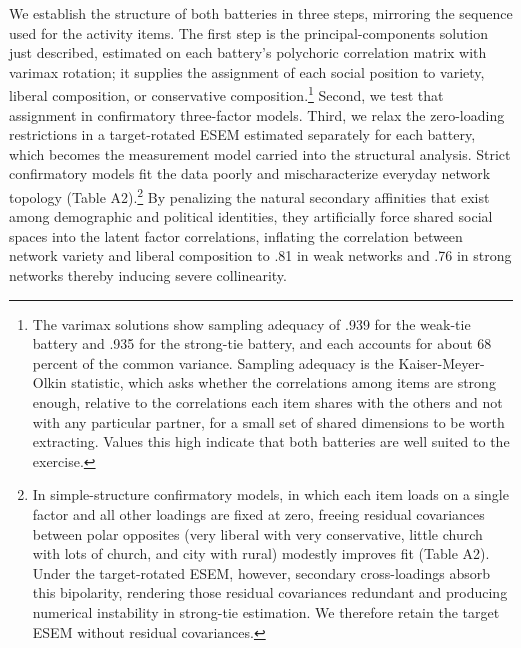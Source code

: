 \documentclass[
  12pt
]{article}
\begin{document}
We establish the structure of both batteries in three steps, mirroring the sequence used for the activity items. The first step is the principal-components solution just described, estimated on each battery's polychoric correlation matrix with varimax rotation; it supplies the assignment of each social position to variety, liberal composition, or conservative composition.\footnote{The varimax solutions show sampling adequacy of .939 for the weak-tie battery and .935 for the strong-tie battery, and each accounts for about 68 percent of the common variance. Sampling adequacy is the Kaiser-Meyer-Olkin statistic, which asks whether the correlations among items are strong enough, relative to the correlations each item shares with the others and not with any particular partner, for a small set of shared dimensions to be worth extracting. Values this high indicate that both batteries are well suited to the exercise.} Second, we test that assignment in confirmatory three-factor models. Third, we relax the zero-loading restrictions in a target-rotated ESEM estimated separately for each battery, which becomes the measurement model carried into the structural analysis. Strict confirmatory models fit the data poorly and mischaracterize everyday network topology (Table A2).\footnote{In simple-structure confirmatory models, in which each item loads on a single factor and all other loadings are fixed at zero, freeing residual covariances between polar opposites (very liberal with very conservative, little church with lots of church, and city with rural) modestly improves fit (Table A2). Under the target-rotated ESEM, however, secondary cross-loadings absorb this bipolarity, rendering those residual covariances redundant and producing numerical instability in strong-tie estimation. We therefore retain the target ESEM without residual covariances.} By penalizing the natural secondary affinities that exist among demographic and political identities, they artificially force shared social spaces into the latent factor correlations, inflating the correlation between network variety and liberal composition to .81 in weak networks and .76 in strong networks thereby inducing severe collinearity. 
\end{document}
